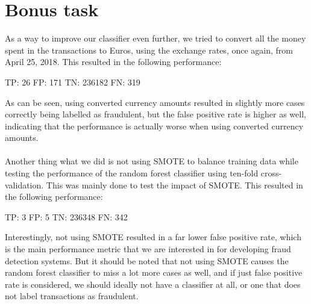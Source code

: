 \documentclass[]{article}
\begin{document}
\section{Bonus task}
As a way to improve our classifier even further, we tried to convert all the money spent in the transactions to Euros, using the exchange rates, once again, from April 25, 2018. This resulted in the following performance:
\begin{flushleft}
	TP: 26 \newline
	FP: 171  \newline
	TN: 236182 \newline
	FN: 319 \newline
\end{flushleft}
As can be seen, using converted currency amounts resulted in slightly more cases correctly being labelled as fraudulent, but the false positive rate is higher as well, indicating that the performance is actually worse when using converted currency amounts.\\
\\
Another thing what we did is not using SMOTE to balance training data while testing the performance of the random forest classifier using ten-fold cross-validation. This was mainly done to test the impact of SMOTE. This resulted in the following performance:
\begin{flushleft}
	TP: 3 \newline
	FP: 5  \newline
	TN: 236348 \newline
	FN: 342 \newline
\end{flushleft}
Interestingly, not using SMOTE resulted in a far lower false positive rate, which is the main performance metric that we are interested in for developing fraud detection systems. But it should be noted that not using SMOTE causes the random forest classifier to miss a lot more cases as well, and if just false positive rate is considered, we should ideally not have a classifier at all, or one that does not label transactions as fraudulent.
\clearpage


\end{document}
